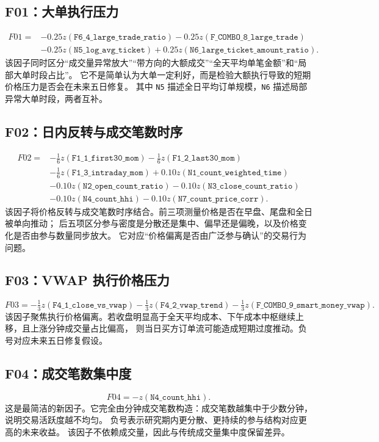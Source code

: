 \documentclass[UTF8,11pt,a4paper]{ctexart}
\newcommand{\z}[1]{z\!\left(#1\right)}
\begin{document}
\subsection{F01：大单执行压力}
\begin{align}
F01={}&-0.25\z{\texttt{F6\_4\_large\_trade\_ratio}}
-0.25\z{\texttt{F\_COMBO\_8\_large\_trade}} \nonumber\\
&-0.25\z{\texttt{N5\_log\_avg\_ticket}}
+0.25\z{\texttt{N6\_large\_ticket\_amount\_ratio}}.
\end{align}
该因子同时区分“成交量异常放大”“带方向的大额成交”“全天平均单笔金额”和“局部大单时段占比”。
它不是简单认为大单一定利好，而是检验大额执行导致的短期价格压力是否会在未来五日修复。
其中 \texttt{N5} 描述全日平均订单规模，\texttt{N6} 描述局部异常大单时段，两者互补。

\subsection{F02：日内反转与成交笔数时序}
\begin{align}
F02={}&-\tfrac{1}{6}\z{\texttt{F1\_1\_first30\_mom}}
-\tfrac{1}{6}\z{\texttt{F1\_2\_last30\_mom}} \nonumber\\
&-\tfrac{1}{6}\z{\texttt{F1\_3\_intraday\_mom}}
+0.10\z{\texttt{N1\_count\_weighted\_time}} \nonumber\\
&-0.10\z{\texttt{N2\_open\_count\_ratio}}
-0.10\z{\texttt{N3\_close\_count\_ratio}} \nonumber\\
&
-0.10\z{\texttt{N4\_count\_hhi}}
-0.10\z{\texttt{N7\_count\_price\_corr}}.
\end{align}
该因子将价格反转与成交笔数时序结合。前三项测量价格是否在早盘、尾盘和全日被单向推动；
后五项区分参与密度是分散还是集中、偏早还是偏晚，以及价格变化是否由参与数量同步放大。
它对应“价格偏离是否由广泛参与确认”的交易行为问题。

\subsection{F03：VWAP 执行价格压力}
\begin{equation}
F03=-\tfrac{1}{3}\z{\texttt{F4\_1\_close\_vs\_vwap}}
-\tfrac{1}{3}\z{\texttt{F4\_2\_vwap\_trend}}
-\tfrac{1}{3}\z{\texttt{F\_COMBO\_9\_smart\_money\_vwap}}.
\end{equation}
该因子聚焦执行价格偏离。若收盘明显高于全天平均成本、下午成本中枢继续上移，且上涨分钟成交量占比偏高，
则当日买方订单流可能造成短期过度推动。负号对应未来五日修复假设。

\subsection{F04：成交笔数集中度}
\begin{equation}
F04=-\z{\texttt{N4\_count\_hhi}}.
\end{equation}
这是最简洁的新因子。它完全由分钟成交笔数构造：成交笔数越集中于少数分钟，说明交易活跃度越不均匀。
负号表示研究期内更分散、更持续的参与结构对应更高的未来收益。
该因子不依赖成交量，因此与传统成交量集中度保留差异。
\end{document}
